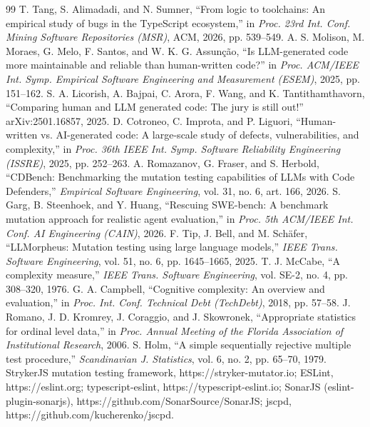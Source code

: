 \documentclass[10pt,conference]{IEEEtran}
\begin{document}
\begin{thebibliography}{99}
 T. Tang, S. Alimadadi, and N. Sumner, “From logic to toolchains: An empirical study of bugs in the TypeScript ecosystem,” in \emph{Proc. 23rd Int. Conf. Mining Software Repositories (MSR)}, ACM, 2026, pp. 539--549.
 A. S. Molison, M. Moraes, G. Melo, F. Santos, and W. K. G. Assunção, “Is LLM-generated code more maintainable and reliable than human-written code?” in \emph{Proc. ACM/IEEE Int. Symp. Empirical Software Engineering and Measurement (ESEM)}, 2025, pp. 151--162.
 S. A. Licorish, A. Bajpai, C. Arora, F. Wang, and K. Tantithamthavorn, “Comparing human and LLM generated code: The jury is still out!” arXiv:2501.16857, 2025.
 D. Cotroneo, C. Improta, and P. Liguori, “Human-written vs. AI-generated code: A large-scale study of defects, vulnerabilities, and complexity,” in \emph{Proc. 36th IEEE Int. Symp. Software Reliability Engineering (ISSRE)}, 2025, pp. 252--263.
 A. Romazanov, G. Fraser, and S. Herbold, “CDBench: Benchmarking the mutation testing capabilities of LLMs with Code Defenders,” \emph{Empirical Software Engineering}, vol. 31, no. 6, art. 166, 2026.
 S. Garg, B. Steenhoek, and Y. Huang, “Rescuing SWE-bench: A benchmark mutation approach for realistic agent evaluation,” in \emph{Proc. 5th ACM/IEEE Int. Conf. AI Engineering (CAIN)}, 2026.
 F. Tip, J. Bell, and M. Schäfer, “LLMorpheus: Mutation testing using large language models,” \emph{IEEE Trans. Software Engineering}, vol. 51, no. 6, pp. 1645--1665, 2025.
 T. J. McCabe, “A complexity measure,” \emph{IEEE Trans. Software Engineering}, vol. SE-2, no. 4, pp. 308--320, 1976.
 G. A. Campbell, “Cognitive complexity: An overview and evaluation,” in \emph{Proc. Int. Conf. Technical Debt (TechDebt)}, 2018, pp. 57--58.
 J. Romano, J. D. Kromrey, J. Coraggio, and J. Skowronek, “Appropriate statistics for ordinal level data,” in \emph{Proc. Annual Meeting of the Florida Association of Institutional Research}, 2006.
 S. Holm, “A simple sequentially rejective multiple test procedure,” \emph{Scandinavian J. Statistics}, vol. 6, no. 2, pp. 65--70, 1979.
 StrykerJS mutation testing framework, https://stryker-mutator.io; ESLint, https://eslint.org; typescript-eslint, https://typescript-eslint.io; SonarJS (eslint-plugin-sonarjs), https://github.com/SonarSource/SonarJS; jscpd, https://github.com/kucherenko/jscpd.
\end{thebibliography}
\end{document}
